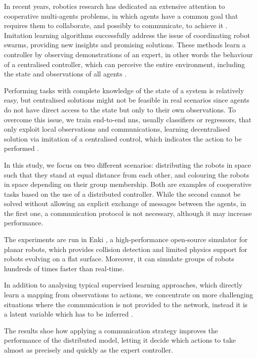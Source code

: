 In recent years, robotics research has dedicated an extensive attention to 
cooperative multi-agents problems, in which agents have a common goal that 
requires them to collaborate, and possibly to communicate, to achieve it 
\cite[][]{ismail2018survey}.
Imitation learning algorithms successfully address the issue of coordinating robot 
swarms, providing new insights and promising solutions. 
These methods learn a controller by observing demonstrations of an expert, in 
other words the behaviour of a centralised controller, which can perceive the 
entire environment, including the state and observations of all agents 
\cite[][]{billard2008survey, zhang2018deep}. 

Performing tasks with complete knowledge of the state of a system is relatively 
easy, but centralised solutions might not be feasible in real scenarios since agents 
do not have direct access to the state but only to their own observations.
To overcome this issue, we train end-to-end \glspl{nn}, usually classifiers or 
regressors, that only exploit local observations and communications, learning 
decentralised solution via imitation of a centralised control, which indicates the 
action to be performed \cite[][]{ross2011reduction, tolstaya2020learning}.

In this study, we focus on two different scenarios: distributing the robots in space 
such that they stand at equal distance from each other, and colouring the robots 
in space depending on their group membership.
Both are examples of cooperative tasks based on the use of a distributed 
controller. While the second cannot be solved without allowing an explicit 
exchange of messages between the agents, in the first one, a communication 
protocol is not necessary, although it may increase performance.

The experiments are run in Enki \cite[][]{enki}, a high-performance open-source 
simulator for planar robots, which provides collision detection and limited physics 
support for robots evolving on a flat surface. Moreover, it can simulate groups of 
robots hundreds of times faster than real-time.

In addition to analysing typical supervised learning approaches, which directly 
learn a mapping from observations to actions, we concentrate on more 
challenging situations where the communication is not provided to the network, 
instead it is a latent variable which has to be inferred \cite[][]{le2017coordinated, 
stadie2017third}.

The results shoe how applying a communication strategy improves the 
performance of the distributed model, letting it decide which actions to take 
almost as precisely and quickly as the expert controller.